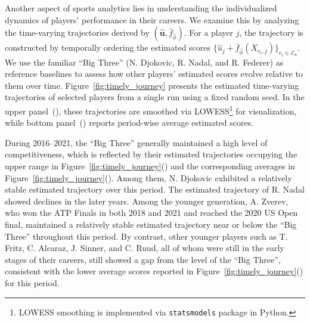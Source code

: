 \documentclass[
  12pt]{article}
\begin{document}
Another aspect of sports analytics lies in understanding the individualized dynamics of players' performance in their careers. We examine this by analyzing the time-varying trajectories derived by $(\widehat{\boldsymbol{u}},\bar{f}_{\widehat{\phi}})$. For a player $j$, the trajectory is constructed by temporally ordering the estimated scores $\{ \widehat{u}_j + \bar{f}_{\widehat{\phi}}(X_{e_i,j}) \}_{e_i \in \mathcal{E}_n}$.  We use the familiar ``Big Three'' (N. Djokovic, R. Nadal, and R. Federer) as reference baselines to assess how other players' estimated scores evolve relative to them over time.  Figure~\ref{fig:timely_journey} presents the estimated time-varying trajectories of selected players from a single run using a fixed random seed. In the upper panel~(), these trajectories are smoothed via LOWESS\footnote{LOWESS smoothing is implemented via \texttt{statsmodels} package in Python.} %
for visualization, while bottom panel~() reports period-wise average estimated scores.

During 2016–2021, the ``Big Three'' generally maintained a high level of competitiveness, which is reflected by their estimated trajectories occupying the upper range in Figure~\ref{fig:timely_journey}() and the corresponding averages in Figure~\ref{fig:timely_journey}(). Among them, N. Djokovic exhibited a relatively stable estimated trajectory over this period. The estimated trajectory of R. Nadal showed declines in the later years. Among the younger generation, A. Zverev, who won the ATP Finals in both 2018 and 2021 and reached the 2020 US Open final, maintained a relatively stable estimated trajectory near or below the ``Big Three'' throughout this period. By contrast, other younger players such as T. Fritz, C. Alcaraz, J. Sinner, and C. Ruud, all of whom were still in the early stages of their careers, still showed a gap from the level of the ``Big Three'', consistent with the lower average scores reported in Figure~\ref{fig:timely_journey}() for this period.
\end{document}
